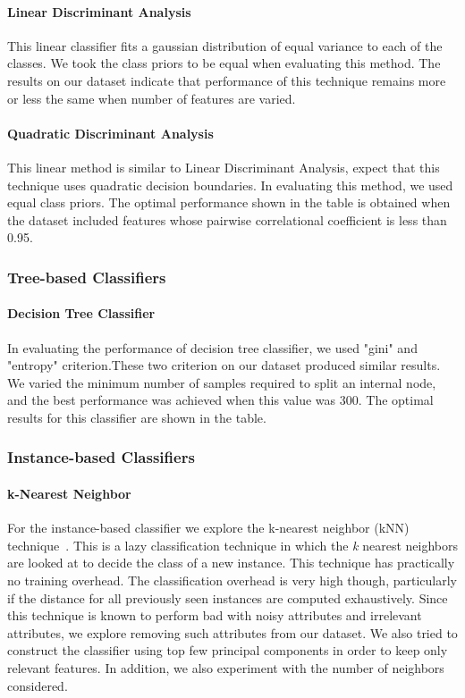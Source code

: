 \paragraph{Linear Discriminant Analysis}

This linear classifier fits a gaussian distribution of equal variance to each of the classes. We took the class priors to be equal when evaluating this method. The results on our dataset indicate that performance of this technique remains more or less the same when number of features are varied.

\paragraph{Quadratic Discriminant Analysis}

This linear method is similar to Linear Discriminant Analysis, expect that this technique uses quadratic decision boundaries. In evaluating this method, we used equal class priors. The optimal performance shown in the table is obtained when the dataset included features whose pairwise correlational coefficient is less than 0.95.

\subsubsection{Tree-based Classifiers}

\paragraph{Decision Tree Classifier}

In evaluating the performance of decision tree classifier, we used "gini" and "entropy" criterion.These two criterion on our dataset produced similar results. We varied the minimum number of samples required to split an internal node, and the best performance was achieved when this value was 300.  The optimal results for this classifier are shown in the table.

\subsubsection{Instance-based Classifiers}

\paragraph{k-Nearest Neighbor}

For the instance-based classifier we explore the k-nearest neighbor (kNN) technique~\cite{kNN}. This is a lazy classification technique in which the \emph{k} nearest neighbors are looked at to decide the class of a new instance. This technique has practically no training overhead. The classification overhead is very high though, particularly if the distance for all previously seen instances are computed exhaustively. Since this technique is known to perform bad with noisy attributes and irrelevant attributes, we explore removing such attributes from our dataset. We also tried to construct the classifier using top few principal components in order to keep only relevant features. In addition, we also experiment with the number of neighbors considered.


